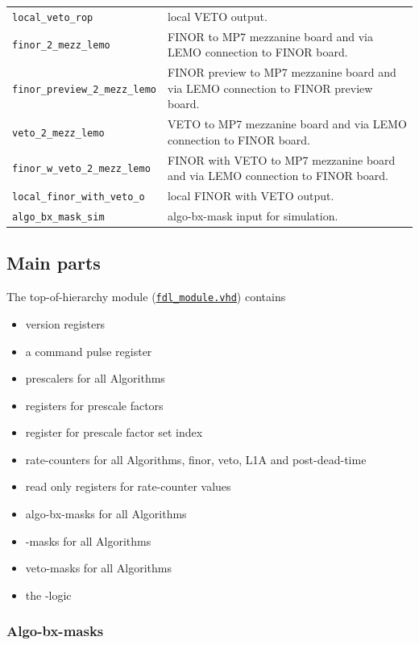 \begin{table}
\begin{tabular}{l p{}}
\verb|local_veto_rop| & local VETO output.\\
\verb|finor_2_mezz_lemo| & FINOR to MP7 mezzanine board and via LEMO connection to FINOR board.\\
\verb|finor_preview_2_mezz_lemo| & FINOR preview to MP7 mezzanine board and via LEMO connection to FINOR preview board.\\
\verb|veto_2_mezz_lemo| & VETO to MP7 mezzanine board and via LEMO connection to FINOR board.\\
\verb|finor_w_veto_2_mezz_lemo| & FINOR with VETO to MP7 mezzanine board and via LEMO connection to FINOR board.\\
\verb|local_finor_with_veto_o| & local FINOR with VETO output.\\
\verb|algo_bx_mask_sim| & algo-bx-mask input for simulation.\\
\bottomrule
\end{tabular}
\label{tab:fdl:explanation_fdl_module_vhd}
\end{table}

\clearpage

\subsection{Main parts}

The top-of-hierarchy module (\href{\gitbranch/firmware/hdl/payload/fdl_module.vhd}{\texttt{fdl\_module.vhd}}) contains
\begin {itemize}
\item version registers
\item a command pulse register
\item prescalers for all Algorithms
\item registers for prescale factors
\item register for prescale factor set index
\item rate-counters for all Algorithms, finor, veto, L1A and post-dead-time
\item read only registers for rate-counter values
\item algo-bx-masks for all Algorithms
\item \finor-masks for all Algorithms
\item veto-masks for all Algorithms
\item the \finor-logic
\end {itemize}

\subsubsection{Algo-bx-masks}
\label{sec:fdl:algo_bx_masks}

